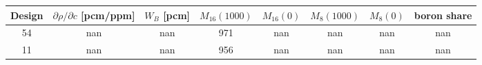 \begin{tabular}{cccccccc}
\toprule
Design & $\partial\rho/\partial c$ [pcm/ppm] & $W_B$ [pcm] & $M_{16}(1000)$ & $M_{16}(0)$ & $M_{8}(1000)$ & $M_{8}(0)$ & boron share \\
\midrule
    54 & nan & nan & 971 & nan & nan & nan & nan \\
    11 & nan & nan & 956 & nan & nan & nan & nan \\
\bottomrule
\end{tabular}

